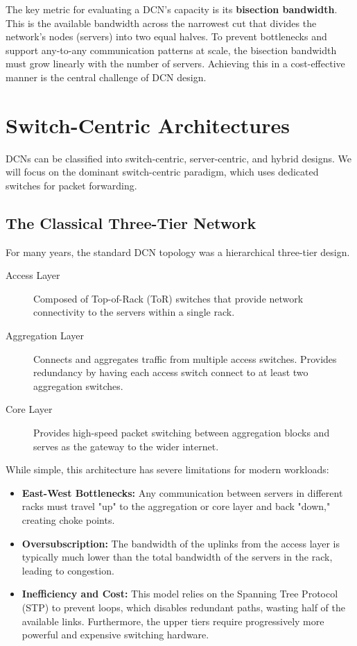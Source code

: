The key metric for evaluating a DCN's capacity is its \textbf{bisection bandwidth}. This is the available bandwidth across the narrowest cut that divides the network's nodes (servers) into two equal halves. To prevent bottlenecks and support any-to-any communication patterns at scale, the bisection bandwidth must grow linearly with the number of servers. Achieving this in a cost-effective manner is the central challenge of DCN design.

\section{Switch-Centric Architectures}
DCNs can be classified into switch-centric, server-centric, and hybrid designs. We will focus on the dominant switch-centric paradigm, which uses dedicated switches for packet forwarding.

\subsection{The Classical Three-Tier Network}
For many years, the standard DCN topology was a hierarchical three-tier design.


\begin{description}
    \item[Access Layer] Composed of Top-of-Rack (ToR) switches that provide network connectivity to the servers within a single rack.
    \item[Aggregation Layer] Connects and aggregates traffic from multiple access switches. Provides redundancy by having each access switch connect to at least two aggregation switches.
    \item[Core Layer] Provides high-speed packet switching between aggregation blocks and serves as the gateway to the wider internet.
\end{description}

While simple, this architecture has severe limitations for modern workloads:
\begin{itemize}
    \item \textbf{East-West Bottlenecks:} Any communication between servers in different racks must travel "up" to the aggregation or core layer and back "down," creating choke points.
    \item \textbf{Oversubscription:} The bandwidth of the uplinks from the access layer is typically much lower than the total bandwidth of the servers in the rack, leading to congestion.
    \item \textbf{Inefficiency and Cost:} This model relies on the Spanning Tree Protocol (STP) to prevent loops, which disables redundant paths, wasting half of the available links. Furthermore, the upper tiers require progressively more powerful and expensive switching hardware.
\end{itemize}

